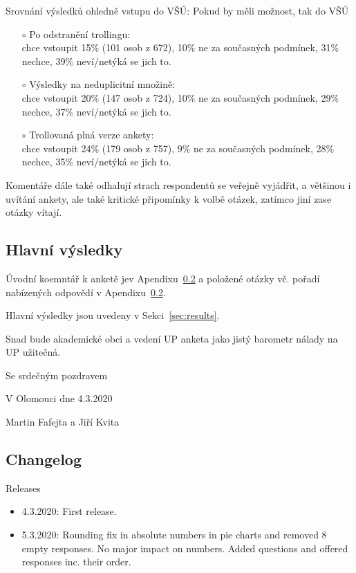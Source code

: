 \documentclass[a4paper,twoside]{article}
\begin{document}
\begin{itemize}
{\bf 
  \item Srovnání výsledků ohledně vstupu do VŠÚ: Pokud by měli možnost, tak do VŠÚ
    \begin{itemize}
       \item[$\circ$] Po odstranění trollingu:
       \\  chce vstoupit 15\% (101 osob z 672), 10\% ne za současných podmínek, 31\% nechce, 39\% neví/netýká se jich to.
       \item[$\circ$] Výsledky na neduplicitní množině:
       \\  chce vstoupit 20\% (147 osob z 724), 10\% ne za současných podmínek, 29\% nechce, 37\% neví/netýká se jich to.
       \item[$\circ$] Trollovaná plná verze ankety:
         \\ chce vstoupit 24\% (179 osob z 757), 9\% ne za současných podmínek, 28\% nechce, 35\% neví/netýká se jich to.
    \end{itemize}
}
  \item Komentáře dále také odhalují strach respondentů se veřejně vyjádřit, a většinou i uvítání ankety, ale také kritické připomínky k volbě otázek, zatímco jiní zase otázky vítají.
\end{itemize}

\subsection{Hlavní výsledky}

Úvodní koemntář k anketě jev Apendixu~\ref{} a položené otázky vč. pořadí nabízených odpovědí v Apendixu~\ref{}.

Hlavní výsledky jsou uvedeny v Sekci~\ref{sec:results}.

\bigskip

\noindent Snad bude akademické obci a vedení UP anketa jako jistý barometr nálady na UP užitečná.

\bigskip

Se srdečným pozdravem

V Olomouci dne 4.3.2020

Martin Fafejta a Jiří Kvita

\subsection{Changelog}
Releases
\begin{itemize}
  \item 4.3.2020: First release.
  \item 5.3.2020: Rounding fix in absolute numbers in pie charts and removed 8 empty responses. No major impact on numbers. Added questions and offered responses inc. their order.
\end{itemize}
\end{document}
